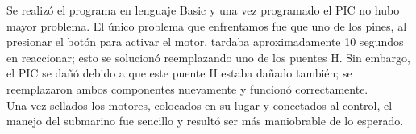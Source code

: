 Se realiz\'o el programa en lenguaje Basic y una vez programado el PIC no hubo mayor problema. El \'unico problema
que enfrentamos fue que uno de los pines, al presionar el bot\'on para activar el motor, tardaba aproximadamente
10 segundos en reaccionar; esto se solucion\'o reemplazando uno de los puentes H.
Sin embargo, el PIC se da\~n\'o debido a que este puente H estaba da\~nado tambi\'en; se reemplazaron ambos
componentes nuevamente y funcion\'o correctamente.\\

Una vez sellados los motores, colocados en su lugar y conectados al control, el manejo del submarino fue sencillo y
result\'o ser m\'as maniobrable de lo esperado.
